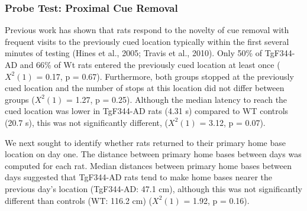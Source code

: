 \documentclass[fleqn,10pt]{wlscirep}
\begin{document}
\subsubsection*{Probe Test: Proximal Cue Removal}
Previous work has shown that rats respond to the novelty of cue removal with frequent visits to the previously cued location typically within the first several minutes of testing \cite{hines_home_2005}(Hines et al., 2005; Travis et al., 2010). Only 50\% of TgF344-AD and 66\% of Wt rats entered the previously cued location at least once ($X^2(1)$ = 0.17, p = 0.67). Furthermore, both groups stopped at the previously cued location and the number of stops at this location did not differ between groups ($X^2(1)$ = 1.27, p = 0.25). Although the median latency to reach the cued location was lower in TgF344-AD rats (4.31 s) compared to WT controls (20.7 s), this was not significantly different, ($X^2(1)$ = 3.12, p = 0.07). 
 
We next sought to identify whether rats returned to their primary home base location on day one. The distance between primary home bases between days was computed for each rat. Median distances between primary home bases between days suggested that TgF344-AD rats tend to make home bases nearer the previous day’s location (TgF344-AD: 47.1 cm), although this was not significantly different than controls (WT: 116.2 cm) ($X^2(1)$ = 1.92, p = 0.16).  



\end{document}
